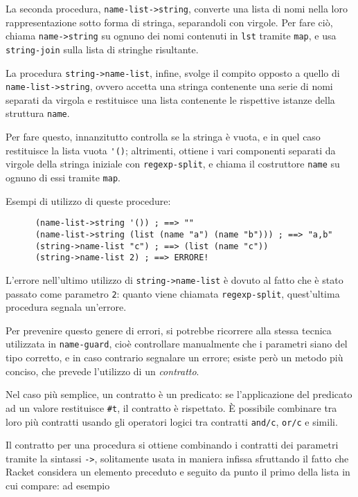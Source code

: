 La seconda procedura, \lstinline{name-list->string}, converte una lista
di nomi nella loro rappresentazione sotto forma di stringa, separandoli
con virgole. Per fare ci\`o, chiama \lstinline{name->string} su ognuno dei
nomi contenuti in \lstinline{lst} tramite \lstinline{map}, e usa
\lstinline{string-join} sulla lista di stringhe risultante.

La procedura \lstinline{string->name-list}, infine, svolge il compito
opposto a quello di \lstinline{name-list->string}, ovvero accetta una
stringa contenente una serie di nomi separati da virgola e restituisce una
lista contenente le rispettive istanze della struttura \lstinline{name}.

Per fare questo, innanzitutto controlla se la stringa \`e vuota, e in quel
caso restituisce la lista vuota \lstinline{'()}; altrimenti, ottiene i vari
componenti separati da virgole della stringa iniziale con
\lstinline{regexp-split}, e chiama il costruttore \lstinline{name} su
ognuno di essi tramite \lstinline{map}.

Esempi di utilizzo di queste procedure:

\begin{lstlisting}
      (name-list->string '()) ; ==> ""
      (name-list->string (list (name "a") (name "b"))) ; ==> "a,b"
      (string->name-list "c") ; ==> (list (name "c"))
      (string->name-list 2) ; ==> ERRORE!
\end{lstlisting}

L'errore nell'ultimo utilizzo di \lstinline{string->name-list} \`e dovuto
al fatto che \`e stato passato come parametro \lstinline{2}: quanto viene
chiamata \lstinline{regexp-split}, quest'ultima procedura segnala un'errore.

Per prevenire questo genere di errori, si potrebbe ricorrere alla stessa
tecnica utilizzata in \lstinline{name-guard}, cio\`e controllare manualmente
che i parametri siano del tipo corretto, e in caso contrario segnalare un
errore; esiste per\`o un metodo pi\`u conciso, che prevede l'utilizzo di
un \emph{contratto}.

Nel caso pi\`u semplice, un contratto \`e un predicato: se l'applicazione
del predicato ad un valore restituisce \lstinline{#t}, il contratto \`e
rispettato. \`E possibile combinare tra loro pi\`u contratti usando gli
operatori logici tra contratti \lstinline{and/c}, \lstinline{or/c} e simili.

Il contratto per una procedura si ottiene combinando i contratti dei
parametri tramite la sintassi \lstinline{->}, solitamente usata in maniera
infissa sfruttando il fatto che Racket considera un elemento preceduto e
seguito da punto il primo della lista in cui compare: ad esempio

